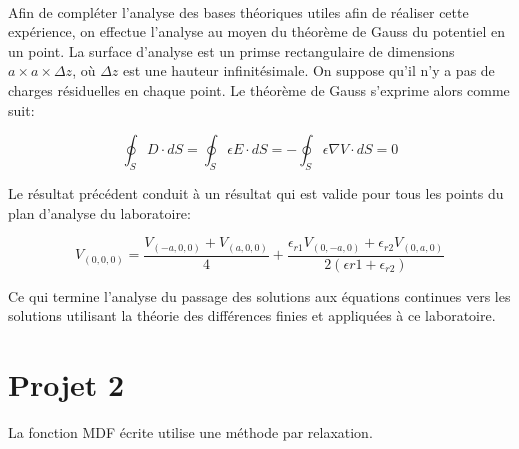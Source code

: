 \paragraph{}Afin de compléter l'analyse des bases théoriques utiles afin de réaliser cette expérience, on effectue l'analyse au moyen du théorème de Gauss du potentiel en un point. La surface d'analyse est un primse rectangulaire de dimensions $a \times a \times \Delta z $, où $\Delta z$ est une hauteur infinitésimale. On suppose qu'il n'y a pas de charges résiduelles en chaque point. Le théorème de Gauss s'exprime alors comme suit:

\begin{equation}
\oint_S D \cdot dS = \oint_S \epsilon E \cdot dS = -\oint_S \epsilon \nabla V \cdot dS  = 0
\end{equation}

Le résultat précédent conduit à un résultat qui est valide pour tous les points du plan d'analyse du laboratoire:

\begin{equation}
V_{(0,0,0)} = \frac{V_{(-a,0,0)} + V_{(a,0,0)}}{4} + \frac{\epsilon_{r1} V_{(0,-a,0)} + \epsilon_{r2} V_{(0,a,0)}}{2(\epsilon{r1} + \epsilon_{r2})}
\end{equation}

Ce qui termine l'analyse du passage des solutions aux équations continues vers les solutions utilisant la théorie des différences finies et appliquées à ce laboratoire.
\section{Projet 2}

La fonction MDF écrite utilise une méthode par relaxation. 

